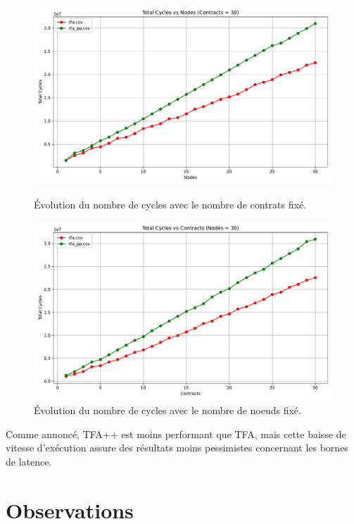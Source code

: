 \documentclass[12pt]{report}
\begin{document}
\begin{figure}[htbp]
  \centering
  \begin{minipage}{0.45\textwidth}
    \centering
    \includegraphics[width=\textwidth]{benchmark_tfapp_contracts.pdf}
    \caption{Évolution du nombre de cycles avec le nombre de contrats fixé.}
  \end{minipage}
  \hfill
  \begin{minipage}{0.45\textwidth}
    \centering
    \includegraphics[width=\textwidth]{benchmark_tfapp_nodes.pdf}
    \caption{Évolution du nombre de cycles avec le nombre de noeuds fixé.}
  \end{minipage}
\end{figure}

\bigskip

Comme annoncé, TFA++ est moins performant que TFA, mais cette baisse de vitesse
d'exécution assure des résultats moins pessimistes concernant les bornes de 
latence. 


\chapter{Observations}
\end{document}
